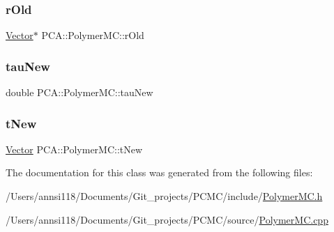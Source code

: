 \hypertarget{class_p_c_a_1_1_polymer_m_c_a6144923e16ec4e3086f92516d8a9117b}{}\label{class_p_c_a_1_1_polymer_m_c_a6144923e16ec4e3086f92516d8a9117b} 
\subsubsection{\texorpdfstring{r\+Old}{rOld}}
{\footnotesize\ttfamily \hyperlink{class_p_c_a_1_1_vector}{Vector}$\ast$ P\+C\+A\+::\+Polymer\+M\+C\+::r\+Old\hspace{0.3cm}{\ttfamily [private]}}

\hypertarget{class_p_c_a_1_1_polymer_m_c_a6400a8ec5f791281122167837d6e4d7d}{}\label{class_p_c_a_1_1_polymer_m_c_a6400a8ec5f791281122167837d6e4d7d} 
\subsubsection{\texorpdfstring{tau\+New}{tauNew}}
{\footnotesize\ttfamily double P\+C\+A\+::\+Polymer\+M\+C\+::tau\+New\hspace{0.3cm}{\ttfamily [private]}}

\hypertarget{class_p_c_a_1_1_polymer_m_c_a1220187032c23f9fd2d78886fd1815b3}{}\label{class_p_c_a_1_1_polymer_m_c_a1220187032c23f9fd2d78886fd1815b3} 
\subsubsection{\texorpdfstring{t\+New}{tNew}}
{\footnotesize\ttfamily \hyperlink{class_p_c_a_1_1_vector}{Vector} P\+C\+A\+::\+Polymer\+M\+C\+::t\+New\hspace{0.3cm}{\ttfamily [private]}}



The documentation for this class was generated from the following files\+:\begin{DoxyCompactItemize}
\item 
/\+Users/annsi118/\+Documents/\+Git\+\_\+projects/\+P\+C\+M\+C/include/\hyperlink{_polymer_m_c_8h}{Polymer\+M\+C.\+h}\item 
/\+Users/annsi118/\+Documents/\+Git\+\_\+projects/\+P\+C\+M\+C/source/\hyperlink{_polymer_m_c_8cpp}{Polymer\+M\+C.\+cpp}\end{DoxyCompactItemize}
